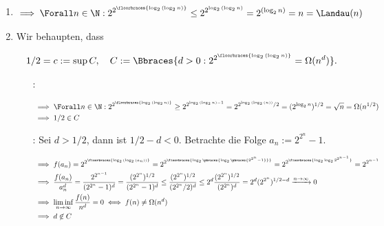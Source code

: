 \begin{solution}

\phantom{}

\begin{enumerate}

  \item

  \begin{align*}
    \implies
    \Forall n \in \N:
    2^{2^{\floorbraces{\log_2{(\log_2{n})}}}}
    \leq
    2^{2^{\log_2{(\log_2{n})}}}
    =
    2^{(\log_2{n})}
    =
    n
    =
    \Landau(n)
  \end{align*}

  \item Wir behaupten, dass
  
  \begin{align*}
    1/2 = c := \sup{C},
    \quad
    C := \Bbraces{d > 0: 2^{2^{\floorbraces{\log_2{(\log_2{n})}}}} = \Omega(n^d)}.
  \end{align*}

  \begin{itemize}

    \item
    [\Quote{$\leq$}:]

    \begin{align*}
      & \implies
      \Forall n \in \N:
      2^{2^{\floorbraces{\log_2{(\log_2{n})}}}}
      \geq
      2^{2^{\log_2{(\log_2{n})} - 1}}
      =
      2^{2^{\log_2{(\log_2{(n)})}} / 2}
      =
      (2^{\log_2{n}})^{1/2}
      =
      \sqrt{n}
      =
      \Omega(n^{1/2}) \\
      & \implies
      1/2 \in C
    \end{align*}

    \item
    [\Quote{$\geq$}:]
    Sei $d > 1/2$, dann ist $1/2 - d < 0$.
    Betrachte die Folge $a_n := 2^{2^n} - 1$.

    \begin{align*}
      & \implies
      f(a_n) = 2^{2^{\floorbraces{\log_2{(\log_2{(a_n)})}}}}
      =
      2^{2^{\floorbraces{\log_2 \pbraces{\log_2 \pbraces{2^{2^n} - 1}}}}}
      =
      2^{2^{\floorbraces{\log_2{\log_2{2^{2^{n-1}}}}}}}
      =
      2^{2^{n-1}} \\
      & \implies
      \frac{f(a_n)}{a_n^d}
      =
      \frac{2^{2^{n-1}}}{(2^{2^n} - 1)^d}
      =
      \frac{(2^{2^n})^{1/2}}{(2^{2^n} - 1)^d}
      \leq
      \frac{(2^{2^n})^{1/2}}{(2^{2^n}/2)^d}
      \leq
      2^d \frac{(2^{2^n})^{1/2}}{(2^{2^n})^d}
      =
      2^d (2^{2^n})^{1/2 - d}
      \xrightarrow{n \to \infty}
      0 \\
      & \implies
      \liminf_{n \to \infty}
      \frac{f(n)}{n^d} = 0
      \iff
      f(n) \neq \Omega(n^d) \\
      & \implies
      d \not \in C
    \end{align*}

  \end{itemize}

\end{enumerate}

\end{solution}

